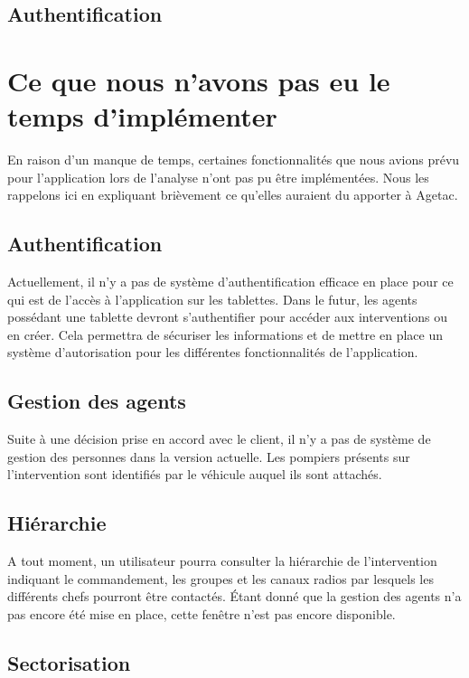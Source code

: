 \documentclass{article}
\begin{document}
\subsection{Authentification}


\section{Ce que nous n'avons pas eu le temps d'implémenter}

 En raison d'un manque de temps, certaines fonctionnalités que 
nous avions prévu pour l'application lors de l'analyse n'ont pas pu être implémentées. 
Nous les rappelons ici en expliquant brièvement ce qu'elles auraient du apporter 
à Agetac.

\subsection{Authentification}

Actuellement, il n'y a pas de système d'authentification efficace 
en place pour ce qui est de l'accès à l'application sur les tablettes. Dans le 
futur, les agents possédant une tablette devront s'authentifier pour accéder 
aux interventions ou en créer. Cela permettra de sécuriser les informations et 
de mettre en place un système d'autorisation pour les différentes fonctionnalités 
de l'application.

\subsection{Gestion des agents}

Suite à une décision prise en accord avec le client, il n'y 
a pas de système de gestion des personnes dans la version actuelle. Les pompiers 
présents sur l'intervention sont identifiés par le véhicule auquel ils sont 
attachés.

\subsection{Hiérarchie}

A tout moment, un utilisateur pourra consulter la hiérarchie 
de l'intervention indiquant le commandement, les groupes et les canaux radios par 
lesquels les différents chefs pourront être contactés. Étant donné que la 
gestion des agents n'a pas encore été mise en place, cette fenêtre n'est pas 
encore disponible.

\subsection{Sectorisation}
\end{document}
